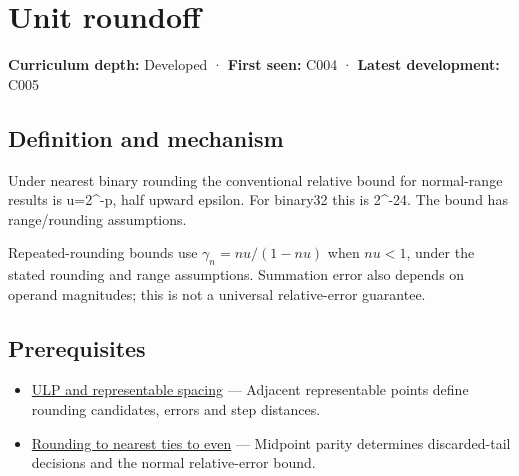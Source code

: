 \hypertarget{appendix-bc44f7b42f42}{}\label{referencestart:appendix-bc44f7b42f42}
\section{Unit roundoff}\label{appendix-bc44f7b42f42-unit-roundoff}

\hypertarget{appendix-bc44f7b42f42-unit-roundoff}{}

\textbf{Curriculum depth:} Developed · \textbf{First seen:} C004 · \textbf{Latest development:} C005

\begin{allmightroledefinition}

\subsection{Definition and mechanism}\label{appendix-bc44f7b42f42-definition-and-mechanism}

\hypertarget{appendix-bc44f7b42f42-definition-and-mechanism}{}

Under nearest binary rounding the conventional relative bound for normal-range results is u=2\^{}-p, half upward epsilon. For binary32 this is 2\^{}-24. The bound has range/rounding assumptions.

\end{allmightroledefinition}

Repeated-rounding bounds use \(\gamma_n=nu/(1-nu)\) when \(nu<1\), under the stated rounding and range assumptions. Summation error also depends on operand magnitudes; this is not a universal relative-error guarantee.

\subsection{Prerequisites}\label{appendix-bc44f7b42f42-prerequisites}

\hypertarget{appendix-bc44f7b42f42-prerequisites}{}

\begin{itemize}
\tightlist
\item
  \hyperref[appendix-14bab4cab9d4]{ULP and representable spacing} --- Adjacent representable points define rounding candidates, errors and step distances.
\item
  \hyperref[appendix-614afe1de592]{Rounding to nearest ties to even} --- Midpoint parity determines discarded-tail decisions and the normal relative-error bound.
\end{itemize}

